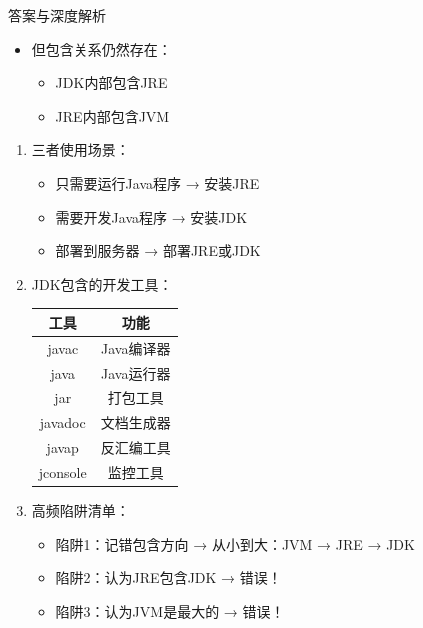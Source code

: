 \documentclass[12pt, a4paper]{ctexart}
\begin{document}
\begin{enumerate}[label=\textbf{\arabic*.}]
\begin{bluebox}{答案与深度解析}
\begin{itemize}[leftmargin=*, nosep]
			      \item 但包含关系仍然存在：
			            \begin{itemize}
				            \item JDK内部包含JRE
				            \item JRE内部包含JVM
			            \end{itemize}
		      \end{itemize}

		      \begin{enumerate}[leftmargin=*, nosep]
			      \item 三者使用场景：
			            \begin{itemize}
				            \item 只需要运行Java程序 → 安装JRE
				            \item 需要开发Java程序 → 安装JDK
				            \item 部署到服务器 → 部署JRE或JDK
			            \end{itemize}

			      \item JDK包含的开发工具：
			            \begin{tabular}{|c|c|}
				            \hline
				            \textbf{工具} & \textbf{功能} \\
				            \hline
				            javac       & Java编译器     \\
				            \hline
				            java        & Java运行器     \\
				            \hline
				            jar         & 打包工具        \\
				            \hline
				            javadoc     & 文档生成器       \\
				            \hline
				            javap       & 反汇编工具       \\
				            \hline
				            jconsole    & 监控工具        \\
				            \hline
			            \end{tabular}

			      \item 高频陷阱清单：
			            \begin{itemize}
				            \item 陷阱1：记错包含方向 → 从小到大：JVM → JRE → JDK
				            \item 陷阱2：认为JRE包含JDK → 错误！
				            \item 陷阱3：认为JVM是最大的 → 错误！
			            \end{itemize}
		      \end{enumerate}


\end{bluebox}
\end{enumerate}
\end{document}
